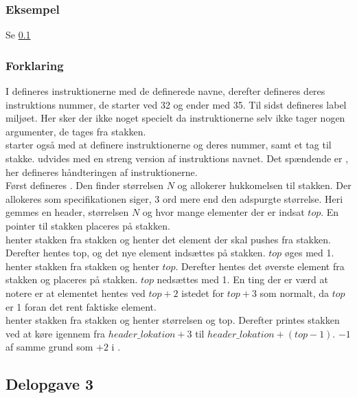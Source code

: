 \subsubsection{Eksempel}
Se \ref{ass:2-3}

\subsubsection{Forklaring}
I  defineres instruktionerne med de definerede navne, derefter defineres deres instruktions nummer, de starter ved 32 og ender med 35. Til sidst defineres label miljøet. Her sker der ikke noget specielt da instruktionerne selv ikke tager nogen argumenter, de tages fra stakken.\\[1ex]

 starter også med at definere instruktionerne og deres nummer, samt et tag til stakke.  udvides med en streng version af instruktions navnet. Det spændende er , her defineres håndteringen af instruktionerne.\\

Først defineres . Den finder størrelsen $N$ og allokerer hukkomelsen til stakken. Der allokeres som specifikationen siger, 3 ord mere end den adspurgte størrelse. Heri gemmes en header, størrelsen $N$ og hvor mange elementer der er indsat $top$. En pointer til stakken placeres på stakken.\\

 henter stakken fra stakken og henter det element der skal pushes fra stakken. Derefter hentes top, og det nye element indsættes på stakken. $top$ øges med 1.\\

 henter stakken fra stakken og henter $top$. Derefter hentes det øverste element fra stakken og placeres på stakken. $top$ nedsættes med 1. En ting der er værd at notere er at elementet hentes ved $top+2$ istedet for $top+3$ som normalt, da $top$ er 1 foran det rent faktiske element.\\

 henter stakken fra stakken og henter størrelsen og top. Derefter printes stakken ved at køre igennem fra $header\_lokation+3$ til $header\_lokation + (top-1)$. $-1$ af samme grund som $+2$ i .



\subsection{Delopgave 3}\label{ass:2-3}
